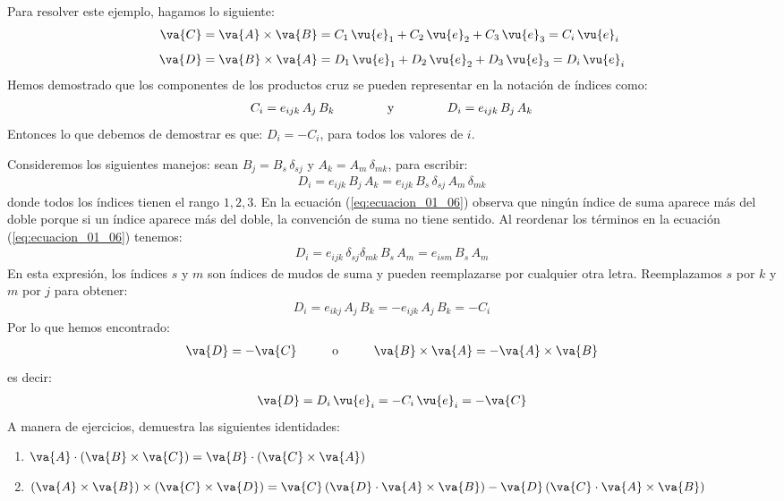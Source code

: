 Para resolver este ejemplo, hagamos lo siguiente:
\begin{align*}
\va{C} &= \va{A} \times \va{B} = C_{1} \, \vu{e}_{1} + C_{2} \, \vu{e}_{2} + C_{3} \, \vu{e}_{3} = C_{i} \, \vu{e}_{i} \\[0.5em]
\va{D} &= \va{B} \times \va{A} = D_{1} \, \vu{e}_{1} + D_{2} \, \vu{e}_{2} + D_{3} \, \vu{e}_{3} = D_{i} \, \vu{e}_{i}
\end{align*}
Hemos demostrado que los componentes de los productos cruz  se pueden representar en la notación de índices como:
\begin{align*}
C_{i} = e_{ijk} \, A_{j} \, B_{k} \hspace{1.5cm} \mbox{y} \hspace{1.5cm} D_{i} = e_{ijk} \, B_{j} \, A_{k}
\end{align*}
Entonces lo que debemos de demostrar es que: $D_{i} = - C_{i}$, para todos los valores de $i$.
\par
Consideremos los siguientes manejos: sean $B_{j} = B_{s} \, \delta_{sj}$ y $A_{k} = A_{m} \, \delta_{mk}$, para escribir:
\begin{align}
D_{i} = e_{ijk} \, B_{j} \, A_{k} = e_{ijk} \, B_{s} \, \delta_{sj} \, A_{m} \, \delta_{mk}
\label{eq:ecuacion_01_06}
\end{align}
donde todos los índices tienen el rango $1, 2, 3$. En la ecuación (\ref{eq:ecuacion_01_06}) observa que ningún índice de suma aparece más del doble porque si un índice aparece más del doble, la convención de suma no tiene sentido. Al reordenar los términos en la ecuación (\ref{eq:ecuacion_01_06}) tenemos:
\begin{align*}
D_{i} = e_{ijk} \, \delta_{sj} \delta_{mk} \, B_{s} \, A_{m} = e_{ism} \, B_{s} \, A_{m}
\end{align*}
En esta expresión, los índices $s$ y $m$ son índices de mudos de suma y pueden reemplazarse por cualquier otra letra. Reemplazamos $s$ por $k$ y $m$ por $j$ para obtener:
\begin{align*}
D_{i} = e_{ikj} \, A_{j} \, B_{k} = - e_{ijk} \, A_{j} \, B_{k} = - C_{i}
\end{align*}
Por lo que hemos encontrado:
\begin{align*}
\va{D} = - \va{C} \hspace{1cm} \mbox{o} \hspace{1cm} \va{B} \times \va{A} = - \va{A} \times \va{B}
\end{align*}
es decir:
\begin{align*}
\va{D} = D_{i} \, \vu{e}_{i} = - C_{i} \, \vu{e}_{i} = - \va{C}
\end{align*}
A manera de ejercicios, demuestra las siguientes identidades:
\begin{enumerate}
\item $\va{A} \cdot (\va{B} \times \va{C}) = \va{B} \cdot (\va{C} \times \va{A})$
\item $(\va{A} \times \va{B}) \times (\va{C} \times \va{D}) = \va{C} \, ( \va{D} \cdot \va{A} \times \va{B}) - \va{D} \, (\va{C} \cdot \va{A} \times \va{B})$
\end{enumerate}

